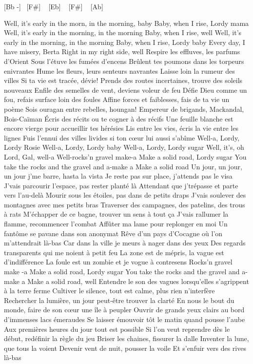


[Bb -] ~[F#] ~ [Eb] ~ [F#] ~ [Ab] ~

Well, it's early in the morn, in the morning, baby
Baby, when I rise, Lordy mama
Well, it's early in the morning, in the morning
Baby, when I rise, well
Well, it's early in the morning, in the morning
Baby, when I rise, Lordy baby
Every day, I have misery, Berta
Right in my right side, well
Respire les effluves, les parfums d'Orient
Sous l'étuve les fumées d'encens
Brûlent tes poumons dans les torpeurs enivrantes
Hume les fleurs, leurs senteurs navrantes
Laisse loin la rumeur des villes
Si ta vie est tracée, dévie!
Prends des routes incertaines, trouve des soleils nouveaux
Enfile des semelles de vent, deviens voleur de feu
Défie Dieu comme un fou, refais surface loin des foules
Affine forces et faiblesses, fais de ta vie un poème
Sois ouragan entre rebelles, houngan!
Empereur de brigands, Mackandal, Bois-Caïman
Écris des récits ou te cogner à des récifs
Une feuille blanche est encore vierge pour accueillir tes hérésies
Lis entre les vies, écris la vie entre les lignes
Fuis l'ennui des villes livides si ton cœur lui aussi s'abîme
Well-a, Lordy, Lordy Rosie
Well-a, Lordy, Lordy baby
Well-a, Lordy, Lordy sugar
Well, it's, oh Lord, Gal, well-a
Well-rocks'n gravel make-a
Make a solid road, Lordy sugar
You take the rocks and the gravel and a-make a
Make a solid road
Un jour, un jour, un jour j'me barre, hasta la vista
Je reste pas sur place, j'attends pas le visa
J'vais parcourir l'espace, pas rester planté là
Attendant que j'trépasse et parte vers l'au-delà
Mourir sous les étoiles, pas dans de petits draps
J'vais soulever des montagnes avec mes petits bras
Traverser des campagnes, des patelins, des trous à rats
M'échapper de ce bagne, trouver un sens à tout ça
J'vais rallumer la flamme, recommencer l'combat
Affûter ma lame pour replonger en moi
Un fantôme se pavane dans son anonymat
Rêve d'un pays d'Cocagne où l'on m'attendrait là-bas
Car dans la ville je meurs à nager dans des yeux
Des regards transparents qui me noient à petit feu
La zone est de mépris, la vague est d'indifférence
La foule est un zombie et je vogue à contresens
Rocks'n gravel make -a
Make a solid road, Lordy sugar
You take the rocks and the gravel and a-make a
Make a solid road, well
Entendre le son des vagues lorsqu'elles s'agrippent à la terre ferme
Cultiver le silence, tout est calme, plus rien n'interfère
Rechercher la lumière, un jour peut-être trouver la clarté
En nous le bout du monde, faire de son cœur une île à peupler
Ouvrir de grands yeux clairs au bord d'immenses lacs émeraudes
Se laisser émouvoir tôt le matin quand pousse l'aube
Aux premières heures du jour tout est possible
Si l'on veut reprendre dès le début, redéfinir la règle du jeu
Briser les chaines, fissurer la dalle
Inventer la lune, que tous la voient
Devenir vent de nuit, pousser la voile
Et s'enfuir vers des rives là-bas